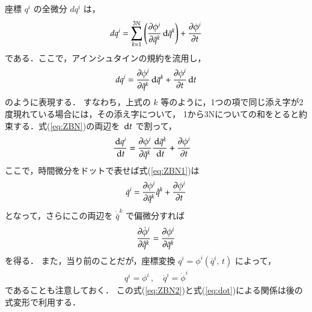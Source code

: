             座標 $q^{i}$ の全微分 $dq^{i}$ は，
                \begin{align*}
                    dq^{i} = \sum_{k=1}^{3N}\left(\frac{\partial \phi^{i}}{\partial \bar{q}^{k}}\,\mathrm{d}\bar{q}^{k}\right)+\frac{\partial \phi^{i}}{\partial t}
                \end{align*}
            である．ここで，アインシュタインの規約を流用し，
                \begin{align}\label{eq:ZBN}
                    dq^{i} = \frac{\rd \phi^{i}}{\rd \bar{q}^{k}}\df\bar{q}^{k}+\frac{\rd \phi^{i}}{\rd t}\df t
                \end{align}
            のように表現する．
            すなわち，上式の $k$ 等のように，1つの項で同じ添え字が2度現れている場合には，その添え字について，
            1から3Nについての和をとると約束する．式(\ref{eq:ZBN})の両辺を $\,\mathrm{d} t$ で割って，
                \begin{align}\label{eq:ZBN1}
                    \frac{\df q^{i}}{\df t} &= \frac{\rd \phi^{i}}{\rd \bar{q}^{k}}\frac{\df \bar{q}^{k}}{\df t}+\frac{\rd \phi^{i}}{\rd t}
                \end{align}
            ここで，時間微分をドットで表せば式(\ref{eq:ZBN1})は
                \begin{equation*}
                    \dot{q}^{i} = \frac{\partial \phi^{i}}{\partial \bar{q}^{k}}\dot{\bar{q}}^{k}+\frac{\partial \phi^{i}}{\partial t}
                \end{equation*}
            となって，さらにこの両辺を $\dot{\bar{q}}^{k}$ で偏微分すれば
                \begin{align}\label{eq:ZBN2}
                    \frac{\rd \dot{\phi}^{i}}{\rd \dot{\bar{q}}^{k}} = \frac{\rd \phi^{i}}{\rd \bar{q}^{k}}
                \end{align}
            を得る．
            また，当り前のことだが，座標変換 $q^{i}=\phi^{i} (\bar{q}^{i},\,t)$ によって，
                \begin{align}\label{eq:dot}
                    q^{i}=\phi^{i} \,,\quad \dot{q}^{i}=\dot{\phi}^{i}
                \end{align}
            であることも注意しておく．
            この式(\ref{eq:ZBN2})と式(\ref{eq:dot})による関係は後の式変形で利用する．

